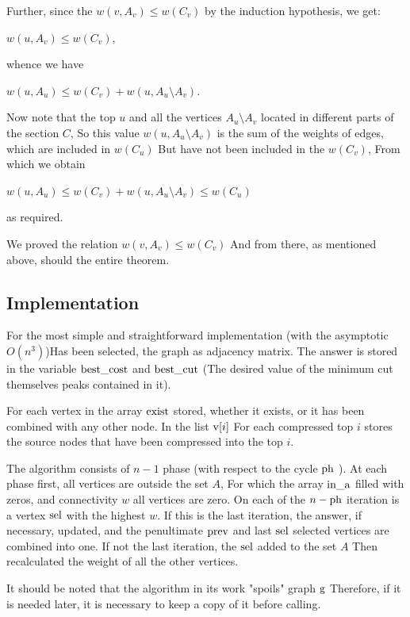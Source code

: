 Further, since the $w (v, A_v) \le w (C_v)$ by the induction hypothesis, we get:

$w (u, A_v) \le w (C_v),$

whence we have

$w (u, A_u) \le w (C_v) + w (u, A_u \setminus A_v).$

Now note that the top $u$ and all the vertices $A_u \setminus A_v$ located in different parts of the section $C$, So this value $w (u, A_u \setminus A_v)$ is the sum of the weights of edges, which are included in $w (C_u)$ But have not been included in the $w (C_v)$, From which we obtain

$w(u,A_{u})\le w(C_{v})+w(u,A_{u}\setminus A_{v})\le w(C_{u})$

as required.

We proved the relation $w (v, A_v) \le w (C_v)$ And from there, as mentioned above, should the entire theorem.

\subsection{ Implementation }

For the most simple and straightforward implementation (with the asymptotic $O (n ^ 3)$)Has been selected, the graph as adjacency matrix. The answer is stored in the variable $\rm best \_cost$ and $\rm best \_cut$ (The desired value of the minimum cut themselves peaks contained in it).

For each vertex in the array $\rm exist$ stored, whether it exists, or it has been combined with any other node. In the list ${\rm v} [i]$ For each compressed top $i$ stores the source nodes that have been compressed into the top $i$.

The algorithm consists of $n-1$ phase (with respect to the cycle $\rm ph$ ). At each phase first, all vertices are outside the set $A$, For which the array $\rm in \_a$ filled with zeros, and connectivity $w$ all vertices are zero. On each of the $n-{\rm ph}$ iteration is a vertex $\rm sel$ with the highest $w$. If this is the last iteration, the answer, if necessary, updated, and the penultimate $\rm prev$ and last $\rm sel$ selected vertices are combined into one. If not the last iteration, the $\rm sel$ added to the set $A$ Then recalculated the weight of all the other vertices.

It should be noted that the algorithm in its work "spoils" graph $\rm g$ Therefore, if it is needed later, it is necessary to keep a copy of it before calling.

